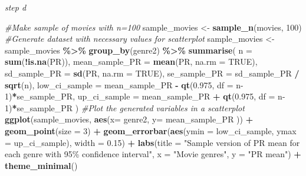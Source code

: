 \documentclass[
]{article}
\newenvironment{Shaded}{\begin{snugshade}}{\end{snugshade}}
\newcommand{\AttributeTok}[1]{\textcolor[rgb]{0.13,0.29,0.53}{#1}}
\newcommand{\CommentTok}[1]{\textcolor[rgb]{0.56,0.35,0.01}{\textit{#1}}}
\newcommand{\ConstantTok}[1]{\textcolor[rgb]{0.56,0.35,0.01}{#1}}
\newcommand{\DecValTok}[1]{\textcolor[rgb]{0.00,0.00,0.81}{#1}}
\newcommand{\FloatTok}[1]{\textcolor[rgb]{0.00,0.00,0.81}{#1}}
\newcommand{\FunctionTok}[1]{\textcolor[rgb]{0.13,0.29,0.53}{\textbf{#1}}}
\newcommand{\NormalTok}[1]{#1}
\newcommand{\OtherTok}[1]{\textcolor[rgb]{0.56,0.35,0.01}{#1}}
\newcommand{\SpecialCharTok}[1]{\textcolor[rgb]{0.81,0.36,0.00}{\textbf{#1}}}
\newcommand{\StringTok}[1]{\textcolor[rgb]{0.31,0.60,0.02}{#1}}
\begin{document}
\emph{step d}

\begin{Shaded}
\begin{Highlighting}[]
\CommentTok{\#Make sample of movies with n=100}
\NormalTok{sample\_movies }\OtherTok{\textless{}{-}} \FunctionTok{sample\_n}\NormalTok{(movies, }\DecValTok{100}\NormalTok{)}
\CommentTok{\#Generate dataset with necessary values for scatterplot}
\NormalTok{sample\_movies }\OtherTok{\textless{}{-}}\NormalTok{ sample\_movies }\SpecialCharTok{\%\textgreater{}\%} \FunctionTok{group\_by}\NormalTok{(genre2) }\SpecialCharTok{\%\textgreater{}\%} 
  \FunctionTok{summarise}\NormalTok{(}
    \AttributeTok{n =} \FunctionTok{sum}\NormalTok{(}\SpecialCharTok{!}\FunctionTok{is.na}\NormalTok{(PR)),}
    \AttributeTok{mean\_sample\_PR =} \FunctionTok{mean}\NormalTok{(PR, }\AttributeTok{na.rm =} \ConstantTok{TRUE}\NormalTok{),}
    \AttributeTok{sd\_sample\_PR =} \FunctionTok{sd}\NormalTok{(PR, }\AttributeTok{na.rm =} \ConstantTok{TRUE}\NormalTok{),}
    \AttributeTok{se\_sample\_PR =}\NormalTok{ sd\_sample\_PR }\SpecialCharTok{/} \FunctionTok{sqrt}\NormalTok{(n),}
    \AttributeTok{low\_ci\_sample =}\NormalTok{ mean\_sample\_PR }\SpecialCharTok{{-}} \FunctionTok{qt}\NormalTok{(}\FloatTok{0.975}\NormalTok{, }\AttributeTok{df =}\NormalTok{ n}\DecValTok{{-}1}\NormalTok{)}\SpecialCharTok{*}\NormalTok{se\_sample\_PR,}
    \AttributeTok{up\_ci\_sample =}\NormalTok{ mean\_sample\_PR }\SpecialCharTok{+} \FunctionTok{qt}\NormalTok{(}\FloatTok{0.975}\NormalTok{, }\AttributeTok{df =}\NormalTok{ n}\DecValTok{{-}1}\NormalTok{)}\SpecialCharTok{*}\NormalTok{se\_sample\_PR}
\NormalTok{  )}
\CommentTok{\#Plot the generated variables in a scatterplot}
\FunctionTok{ggplot}\NormalTok{(sample\_movies, }\FunctionTok{aes}\NormalTok{(}\AttributeTok{x=}\NormalTok{ genre2, }\AttributeTok{y=}\NormalTok{ mean\_sample\_PR )) }\SpecialCharTok{+}
  \FunctionTok{geom\_point}\NormalTok{(}\AttributeTok{size =} \DecValTok{3}\NormalTok{) }\SpecialCharTok{+}
  \FunctionTok{geom\_errorbar}\NormalTok{(}\FunctionTok{aes}\NormalTok{(}\AttributeTok{ymin =}\NormalTok{ low\_ci\_sample, }\AttributeTok{ymax =}\NormalTok{ up\_ci\_sample), }\AttributeTok{width =} \FloatTok{0.15}\NormalTok{) }\SpecialCharTok{+}
  \FunctionTok{labs}\NormalTok{(}\AttributeTok{title =} \StringTok{"Sample version of PR mean for each genre with 95\% confidence interval"}\NormalTok{, }\AttributeTok{x =} \StringTok{"Movie genres"}\NormalTok{, }\AttributeTok{y =} \StringTok{"PR mean"}\NormalTok{) }\SpecialCharTok{+}
  \FunctionTok{theme\_minimal}\NormalTok{()}
\end{Highlighting}
\end{Shaded}
\end{document}
